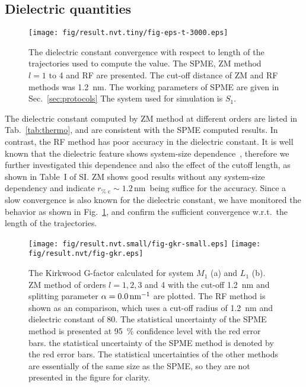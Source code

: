 \documentclass[a4paper,preprint,unsortedaddress,onecolumn,fleqn]{revtex4}
\begin{document}
\subsection{Dielectric quantities}

\begin{figure}[tbp]
\centering
\texttt{[image: fig/result.nvt.tiny/fig-eps-t-3000.eps]}
\caption{The dielectric constant convergence with respect to length of the
trajectories used to compute the value. The SPME, ZM method $l=1$ to 4 and
RF are presented. The cut-off distance of ZM and RF methods was 1.2~nm. The
working parameters of SPME are given in Sec.~\protect\ref{sec:protocols} The
system used for simulation is $S_{1}$.}
\label{fig:eps-conv}
\end{figure}

The dielectric constant computed by ZM method at different orders are listed
in Tab.~\ref{tab:thermo}, and are consistent with the SPME computed results.
In contrast, the RF method has poor accuracy in the dielectric constant. It
is well known that the dielectric feature shows system-size dependence~\cite%
{vanderSpoel2006origin}, therefore we further investigated this dependence
and also the effect of the cutoff length, as shown in Table~I of SI. ZM
shows good results without any system-size dependency and indicate $r_{\text{%
c}}\sim 1.2\,$nm\ being suffice for the accuracy. Since a slow convergence
is also known for the dielectric constant, we have monitored the behavior as
shown in Fig.~\ref{fig:eps-conv}, and confirm the sufficient convergence
w.r.t.~the length of the trajectories.

\begin{figure}[tbp]
\centering
\texttt{[image: fig/result.nvt.small/fig-gkr-small.eps]}\newline
\texttt{[image: fig/result.nvt/fig-gkr.eps]}
\caption{The Kirkwood G-factor calculated for system $M_{1}$ (a) and $L_{1} $
(b). ZM method of orders $l=1,2,3$ and 4 with the cut-off 1.2~nm and
splitting parameter $\protect\alpha =0.0\,\text{nm}^{-1}$ are plotted. The
RF method is shown as an comparison, which uses a cut-off radius of 1.2~nm
and dielectric constant of 80. The statistical uncertainty of the SPME
method is presented at 95~\% confidence level with the red error bars. the
statistical uncertainty of the SPME method is denoted by the red error bars.
The statistical uncertainties of the other methods are essentially of the
same size as the SPME, so they are not presented in the figure for clarity.}
\label{fig:gkr}
\end{figure}
\end{document}
